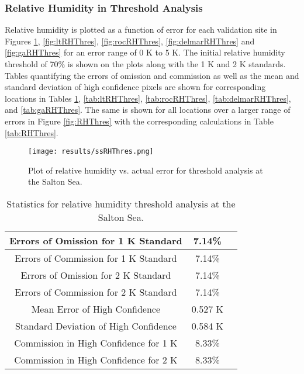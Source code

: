 \documentclass{book}
\begin{document}
\subsubsection{Relative Humidity in Threshold Analysis}

Relative humidity is plotted as a function of error for each validation site in Figures \ref{fig:ssRHThres}, \ref{fig:ltRHThres}, \ref{fig:rocRHThres}, \ref{fig:delmarRHThres} and \ref{fig:gaRHThres} for an error range of 0 K to 5 K.  The initial relative humidity threshold of 70\% is shown on the plots along with the 1 K and 2 K standards.  Tables quantifying the errors of omission and commission as well as the mean and standard deviation of high confidence pixels are shown for corresponding locations in Tables \ref{tab:ssRHThres}, \ref{tab:ltRHThres}, \ref{tab:rocRHThres}, \ref{tab:delmarRHThres}, and \ref{tab:gaRHThres}.  The same is shown for all locations over a larger range of errors in Figure \ref{fig:RHThres} with the corresponding calculations in Table \ref{tab:RHThres}.  

\begin{minipage}[c]{0.47\textwidth}
\centering
\begin{figure}[H]
\texttt{[image: results/ssRHThres.png]}
\caption{Plot of relative humidity vs. actual error for threshold analysis at the Salton Sea.}
\label{fig:ssRHThres}
\end{figure}
\end{minipage}
\begin{minipage}[c]{0.47\textwidth}
\begin{table}[H]
\centering
\footnotesize
\begin{tabular}{ | c | c | c | } \hline
Errors of Omission for 1 K Standard & 7.14\% \\ \hline
Errors of Commission for 1 K Standard & 7.14\% \\ \hline
Errors of Omission for 2 K Standard & 7.14\% \\ \hline
Errors of Commission for 2 K Standard & 7.14\% \\ \hline
Mean Error of High Confidence & 0.527 K \\ \hline
Standard Deviation of High Confidence & 0.584 K \\ \hline
Commission in High Confidence for 1 K & 8.33\% \\ \hline
Commission in High Confidence for 2 K & 8.33\% \\ \hline
\end{tabular}
\caption{Statistics for relative humidity threshold analysis at the Salton Sea.}
\label{tab:ssRHThres}
\end{table}
\end{minipage}
\end{document}
